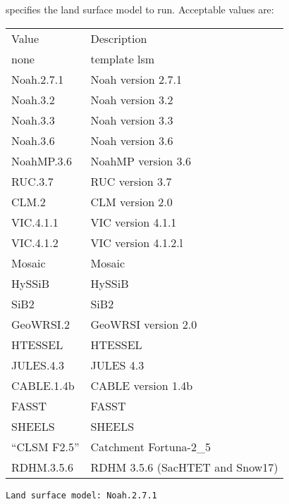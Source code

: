  
  specifies the land surface model to run.
 Acceptable values are:

 \begin{tabular}{ll}
 Value       & Description           \\
 none        & template lsm          \\
 Noah.2.7.1  & Noah version 2.7.1    \\
 Noah.3.2    & Noah version 3.2      \\
 Noah.3.3    & Noah version 3.3      \\
 Noah.3.6    & Noah version 3.6      \\
 NoahMP.3.6  & NoahMP version 3.6    \\
 
 RUC.3.7     & RUC version 3.7       \\
 
 CLM.2       & CLM version 2.0       \\
 VIC.4.1.1   & VIC version 4.1.1     \\
 VIC.4.1.2   & VIC version 4.1.2.l   \\
 Mosaic      & Mosaic                \\
 HySSiB      & HySSiB                \\
 
 SiB2        & SiB2                  \\
 
 GeoWRSI.2   & GeoWRSI version 2.0   \\
 
 HTESSEL     & HTESSEL               \\
 JULES.4.3   & JULES 4.3             \\
 
 CABLE.1.4b  & CABLE version 1.4b    \\
 
 FASST       & FASST                 \\
 SHEELS      & SHEELS                \\
 
 ``CLSM F2.5''  & Catchment Fortuna-2\_5 \\
 RDHM.3.5.6  & RDHM 3.5.6 (SacHTET and Snow17) \\
 \end{tabular}
 

 \begin{Verbatim}[frame=single]
Land surface model: Noah.2.7.1
 \end{Verbatim}

